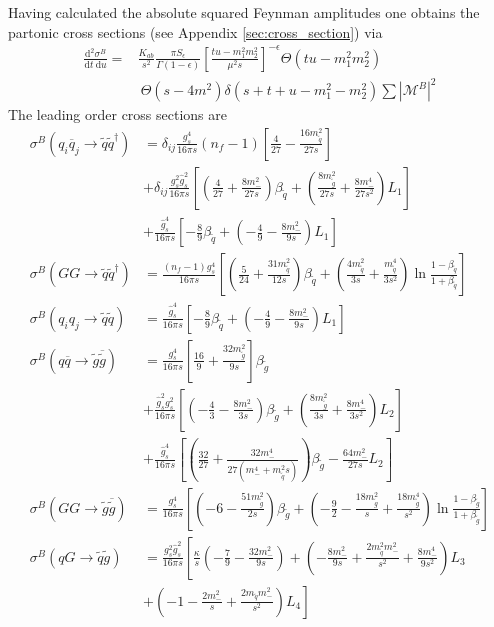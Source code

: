 Having calculated the absolute squared Feynman amplitudes one obtains the partonic cross sections (see Appendix \ref{sec:cross_section}) via
\begin{align}
\frac{\mbox{d}^2 \sigma^B}{\mbox{d}t\ \mbox{d}u} =& \frac{K_{ab}}{s^2} \frac{\pi S_{\epsilon}}{\Gamma(1-\epsilon)} \left[ \frac{tu-m_1^2m_2^2}{\mu^2 s}\right]^{-\epsilon} \Theta(tu-m_1^2m_2^2)\nonumber\\
&\ \Theta(s-4m^2) \delta(s+t+u-m_1^2-m_2^2) \sum |\mathcal{M}^B|^2\label{eq:sigma_tree}
\end{align}
The leading order cross sections are
\begin{align}
\sigma^B(q_i \overline{q}_j \to \tilde{q}\tilde{q}^\dagger) &= \delta_{ij}  \frac{g_s^4}{16\pi s} (n_f-1) \left[ \frac{4}{27} - \frac{16 m_{\tilde{q}}^2}{27s} \right]\nonumber\\
&+ \delta_{ij} \frac{g_s^2\hat{g}_s^2}{16\pi s}  \left[ \left( \frac{4}{27} + \frac{8 m_-^2}{27 s} \right)\beta_{\tilde{q}}  + \left( \frac{8m_{\tilde{g}}^2}{27s} + \frac{8m_-^4}{27s^2} \right)L_1 \right]\nonumber\\
& + \frac{\hat{g}_s^4}{16\pi s} \left[ -\frac{8}{9}\beta_{\tilde{q}} + \left( -\frac{4}{9} - \frac{8m_-^2}{9s} \right)L_1 \right]\\
\sigma^B(GG \to \tilde{q}\tilde{q}^\dagger) &= \frac{(n_f-1) g_s^4}{16\pi s} \left[ \left(\frac{5}{24} + \frac{31 m_{\tilde{q}}^2}{12s}\right)\beta_{\tilde{q}} + \left( \frac{4m_{\tilde{q}}^2}{3s} + \frac{m_{\tilde{q}}^4}{3s^2} \right) \ln \frac{1-\beta_{\tilde{q}}}{1+\beta_{\tilde{q}}} \right]\\
\sigma^B(q_i q_j \to \tilde{q}\tilde{q}) &= \frac{\hat{g}_s^4}{16\pi s} \left[ -\frac{8}{9}\beta_{\tilde{q}} +  \left( -\frac{4}{9} - \frac{8m_-^2}{9s} \right)L_1 \right]\\
\sigma^B(q \overline{q} \to \tilde{g}\overline{\tilde{g}}) &= \frac{g_s^4}{16\pi s} \left[ \frac{16}{9} + \frac{32m_{\tilde{g}}^2}{9s} \right] \beta_{\tilde{g}}\nonumber\\
& + \frac{\hat{g}_s^2 g_s^2}{16\pi s}  \left[ \left( -\frac{4}{3}-\frac{8m_-^2}{3s} \right)\beta_{\tilde{g}} + \left( \frac{8 m_{\tilde{g}}^2}{3s} + \frac{8m_-^4}{3s^2} \right) L_2 \right]\nonumber\\
& + \frac{\hat{g}_s^4}{16\pi s} \left[ \left( \frac{32}{27} + \frac{32 m_-^4}{27(m_-^4 + m_{\tilde{q}}^2s)} \right)\beta_{\tilde{g}} - \frac{64m_-^2}{27s}L_2 \right]\label{eq:qqbar_to_sgsgbar}\\
\sigma^B(GG \to \tilde{g}\overline{\tilde{g}}) &= \frac{g_s^4}{16\pi s} \left[ \left( -6 - \frac{51 m_{\tilde{g}}^2}{2s} \right)\beta_{\tilde{g}} + \left( -\frac{9}{2} - \frac{18 m_{\tilde{g}}^2}{s} + \frac{18 m_{\tilde{g}}^4}{s^2} \right)\ln \frac{1-\beta_{\tilde{g}}}{1+\beta_{\tilde{g}}} \right]\\
\sigma^B(q G \to \tilde{q} \tilde{g}) &= \frac{g_s^2\hat{g}_s^2}{16\pi s} \left[ \frac{\kappa}{s}\left( -\frac{7}{9} - \frac{32 m_{-}^2}{9s} \right) + \left( -\frac{8m_-^2}{9s} + \frac{2m_{\tilde{q}}^2m_-^2}{s^2} + \frac{8 m_-^4}{9s^2} \right)L_3\right.\nonumber\\
&+\left. \left( -1-\frac{2m_-^2}{s} + \frac{2m_{\tilde{q}}m_-^2}{s^2} \right)L_4 \right]
\end{align}
